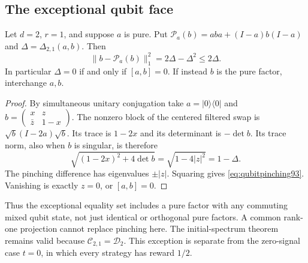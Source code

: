 \subsection{The exceptional qubit face}
\begin{proposition}
\label{prop:qubitpinching93}
Let $d=2$, $r=1$, and suppose $a$ is pure.  Put
$\mathcal P_a(b)=aba+(I-a)b(I-a)$ and
$\Delta=\Delta_{2,1}(a,b)$.  Then
\begin{equation}\label{eq:qubitpinching93}
 \|b-\mathcal P_a(b)\|_1^2=2\Delta-\Delta^2\le2\Delta.
\end{equation}
In particular $\Delta=0$ if and only if $[a,b]=0$.
If instead $b$ is the pure factor, interchange $a,b$.
\end{proposition}
\begin{proof}
By simultaneous unitary conjugation take $a=|0\rangle\langle0|$ and
$b=\left(\begin{smallmatrix}x&z\\\bar z&1-x\end{smallmatrix}\right)$.
The nonzero block of the centered filtered swap is
$\sqrt b(I-2a)\sqrt b$.  Its trace is $1-2x$ and its determinant
is $-\det b$.  Its trace norm, also when $b$ is singular, is therefore
\[
 \sqrt{(1-2x)^2+4\det b}=\sqrt{1-4|z|^2}=1-\Delta.
\]
The pinching difference has eigenvalues $\pm|z|$.
Squaring gives \eqref{eq:qubitpinching93}.  Vanishing is exactly
$z=0$, or $[a,b]=0$.
\end{proof}
Thus the exceptional equality set includes a pure factor with any
commuting mixed qubit state, not just identical or orthogonal pure
factors.  A common rank-one projection cannot replace pinching here.
The initial-spectrum theorem remains valid because
$\mathcal C_{2,1}=\mathcal D_2$.  This exception is separate from the
zero-signal case $t=0$, in which every strategy has reward $1/2$.
